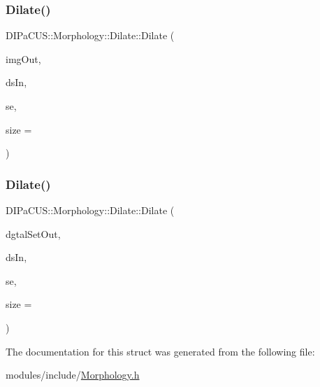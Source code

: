\subsubsection{\texorpdfstring{Dilate()}{Dilate()}\hspace{0.1cm}{\footnotesize\ttfamily [1/2]}}
{\footnotesize\ttfamily D\+I\+Pa\+C\+U\+S\+::\+Morphology\+::\+Dilate\+::\+Dilate (\begin{DoxyParamCaption}\item[{\mbox{\hyperlink{namespaceDIPaCUS_1_1Morphology_a9aff9edf28d681accfc54435fbefcbee}{Image2D}} \&}]{img\+Out,  }\item[{const \mbox{\hyperlink{namespaceDIPaCUS_1_1Morphology_ab69fa725716b0ed4c311c0d00a292be7}{Digital\+Set}} \&}]{ds\+In,  }\item[{\mbox{\hyperlink{namespaceDIPaCUS_1_1Morphology_a60b552d68432e7992f09717070d9c4e7}{Structuring\+Element}}}]{se,  }\item[{int}]{size = {} }\end{DoxyParamCaption})\hspace{0.3cm}{\ttfamily [inline]}}

\mbox{\label{structDIPaCUS_1_1Morphology_1_1Dilate_a66ac7cd8c532a65e3399a889df30b2da}} 
\subsubsection{\texorpdfstring{Dilate()}{Dilate()}\hspace{0.1cm}{\footnotesize\ttfamily [2/2]}}
{\footnotesize\ttfamily D\+I\+Pa\+C\+U\+S\+::\+Morphology\+::\+Dilate\+::\+Dilate (\begin{DoxyParamCaption}\item[{\mbox{\hyperlink{namespaceDIPaCUS_1_1Morphology_ab69fa725716b0ed4c311c0d00a292be7}{Digital\+Set}} \&}]{dgtal\+Set\+Out,  }\item[{const \mbox{\hyperlink{namespaceDIPaCUS_1_1Morphology_ab69fa725716b0ed4c311c0d00a292be7}{Digital\+Set}} \&}]{ds\+In,  }\item[{\mbox{\hyperlink{namespaceDIPaCUS_1_1Morphology_a60b552d68432e7992f09717070d9c4e7}{Structuring\+Element}}}]{se,  }\item[{int}]{size = {} }\end{DoxyParamCaption})\hspace{0.3cm}{\ttfamily [inline]}}



The documentation for this struct was generated from the following file\+:\begin{DoxyCompactItemize}
\item 
modules/include/\mbox{\hyperlink{Morphology_8h}{Morphology.\+h}}\end{DoxyCompactItemize}
